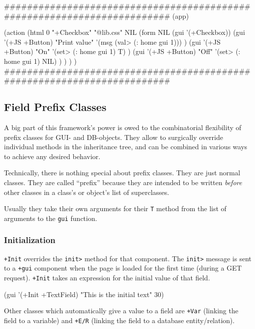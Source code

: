 \begin{wideverbatim}
########################################################################
(app)

(action
   (html 0 "+Checkbox" "@lib.css" NIL
      (form NIL
         (gui '(+Checkbox))
         (gui '(+JS +Button) "Print value"
            '(msg (val> (: home gui 1))) )
         (gui '(+JS +Button) "On"
            '(set> (: home gui 1) T) )
         (gui '(+JS +Button) "Off"
            '(set> (: home gui 1) NIL) ) ) ) )
########################################################################
\end{wideverbatim}


\subsection{Field Prefix Classes}
\label{sec:appl-devel-field-prefix-classes}

A big part of this framework's power is owed to the combinatorial
flexibility of prefix classes for GUI- and DB-objects. They allow to
surgically override individual methods in the inheritance tree, and can
be combined in various ways to achieve any desired behavior.

Technically, there is nothing special about prefix classes. They are
just normal classes. They are called ``prefix'' because they are intended
to be written \emph{before} other classes in a class's or object's list of
superclasses.

Usually they take their own arguments for their \texttt{T} method from the list
of arguments to the \texttt{gui} function.


\subsubsection{ Initialization}
\label{sec:appl-devel-initialization}%

\texttt{+Init} overrides the \texttt{init>} method for that component. The \texttt{init>}
message is sent to a \texttt{+gui} component when the page is loaded for the
first time (during a GET request). \texttt{+Init} takes an expression for the
initial value of that field.


\begin{wideverbatim}
(gui '(+Init +TextField) "This is the initial text" 30)
\end{wideverbatim}

Other classes which automatically give a value to a field are \texttt{+Var}
(linking the field to a variable) and \texttt{+E/R} (linking the field to a
database entity/relation).

